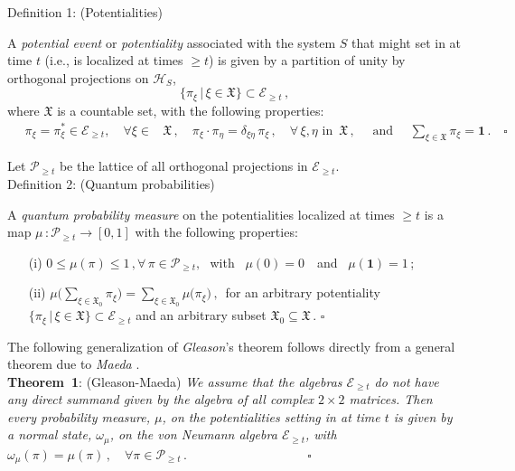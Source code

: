 \documentclass[12pt]{article}
\begin{document}
{Definition 1}: (Potentialities)

A \textit{potential event} or \textit{potentiality} associated with the system $S$ that might set in at time $t$ (i.e., is localized
at times $\geq t$) is given by a partition of unity by orthogonal projections on $\mathcal{H}_S$,
$$\big\{ \pi_{\xi}\, \vert \,\xi \in \mathfrak{X} \big\} \subset \mathcal{E}_{\geq t}\,,$$
where $\mathfrak{X}$ is a countable set, with the following properties:
\begin{align}\label{potentialty}
\quad \pi_{\xi}= \pi_{\xi}^{*} \in \mathcal{E}_{\geq t}, \quad \forall \xi \in &\mathfrak{X}\,,\quad
\pi_{\xi}\cdot\pi_{\eta} = \delta_{\xi \eta}\, \pi_{\xi} \,, \quad \forall\, \xi, \eta \text{ in }\, \mathfrak{X}\,, \quad
\text{ and } \quad \sum_{\xi \in \mathfrak{X}} \pi_{\xi} = \mathbf{1}\,.\quad \square
\end{align}

Let $\mathcal{P}_{\geq t}$ be the lattice of all orthogonal projections in $\mathcal{E}_{\geq t}$. \\

{Definition 2}: (Quantum probabilities)

A \textit{quantum probability measure} on the potentialities localized at times  $\geq t$ is a map 
$\mu\,: \mathcal{P}_{\geq t} \rightarrow [0, 1]$ with the following properties:
\begin{enumerate}
\item[(i)]{ $0 \leq \mu(\pi) \leq 1\,, \forall\, \pi \in \mathcal{P}_{\geq t},$ \,\,with \,\,\,$\mu(0)=0\,$ \, and \, $\mu(\mathbf{1})=1\,$;}
\item[(ii)]{ $\mu\big(\sum_{\xi \in \mathfrak{X}_0} \pi_{\xi}\big) = 
\sum_{\xi \in \mathfrak{X}_0} \mu\big(\pi_{\xi}\big)\,,$
\,for an arbitrary potentiality $\big\{ \pi_{\xi}\, \vert\, \xi \in \mathfrak{X} \big\} \subset \mathcal{E}_{\geq t}$ and 
an arbitrary subset $\mathfrak{X}_0 \subseteq \mathfrak{X}$\,.
\hspace{11cm}$\square$}
\end{enumerate}

The following generalization of \textit{Gleason}'s theorem \cite{Gleason} follows directly from a general theorem due to  
\textit{Maeda} \cite{Maeda}.\\

{\bf{Theorem~1}}: (Gleason-Maeda) \textit{We assume that the algebras $\mathcal{E}_{\geq t}$ do not have any direct 
summand given by the algebra of all complex $2\times 2$ matrices. Then every probability measure, $\mu$, on the 
potentialities setting in at time $t$ is given by a normal state, $\omega_{\mu}$, on the von Neumann algebra 
$\mathcal{E}_{\geq t}$, with \\ 
\vspace{0.1cm}\hspace{5.9cm}
$ \omega_{\mu}(\pi) = \mu(\pi)\,,\quad  \forall \pi \in \mathcal{P}_{\geq t}\,. \hspace{4cm} \square$
}\\
\end{document}
